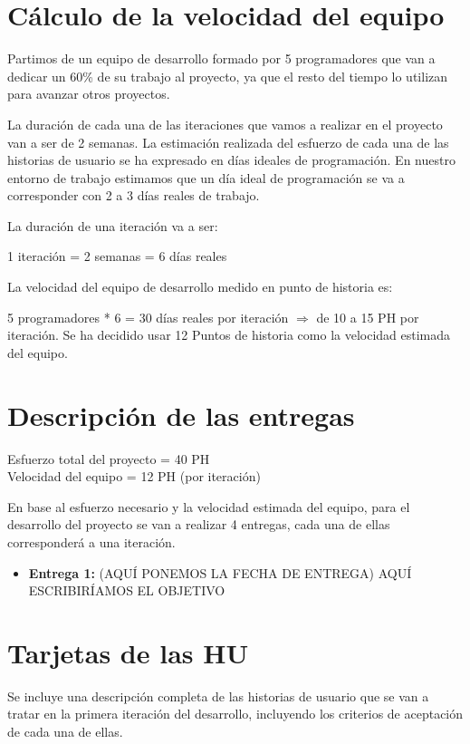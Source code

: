 \documentclass[11pt]{article}
\begin{document}
\section{Cálculo de la velocidad del equipo}
Partimos de un equipo de desarrollo formado  por 5 programadores  que van a dedicar un 60\% de su trabajo al proyecto, ya que el resto del tiempo lo utilizan para avanzar otros proyectos. 

La duración de cada una de las iteraciones que vamos a realizar en el proyecto van a ser de 2 semanas. 
La estimación realizada del esfuerzo de cada una de las historias de usuario se ha expresado en días ideales de programación. En nuestro
entorno de trabajo estimamos que un día ideal de programación se va a corresponder con 2 a 3 días reales de trabajo. 

La duración de una iteración va a ser: 

1 iteración = 2 semanas = 6 días reales 

La velocidad del equipo de desarrollo medido en punto de historia es:  

5 programadores * 6 = 30 días reales por iteración $\Longrightarrow$ de 10 a 15 PH por iteración.  
Se ha decidido usar 12 Puntos de historia como la velocidad estimada del equipo. 

\section{Descripción de las entregas}

Esfuerzo total del proyecto = 40 PH \\
Velocidad del equipo = 12 PH (por iteración) 

En base al esfuerzo necesario y la velocidad estimada del equipo, para el desarrollo del proyecto se van a realizar 4 entregas, cada una de ellas corresponderá a una iteración.
\begin{itemize}
\item \textbf{Entrega 1:} (AQUÍ PONEMOS LA FECHA DE ENTREGA) AQUÍ ESCRIBIRÍAMOS EL OBJETIVO
\end{itemize}

\section{Tarjetas de las HU}
Se incluye una descripción completa de las historias de usuario que se van a tratar en la primera iteración del desarrollo, incluyendo los criterios de aceptación de cada una de ellas.
\end{document}
